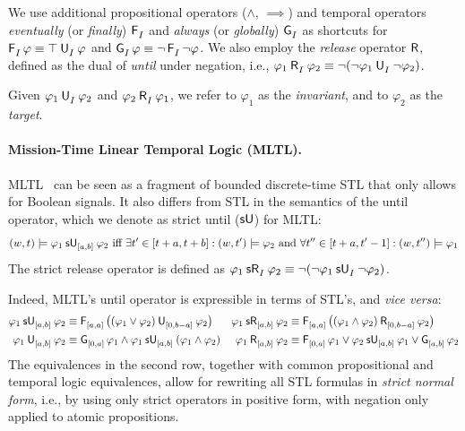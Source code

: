 \documentclass{easychair}
\begin{document}
We use additional propositional operators ($\land$, $\implies$)
and temporal operators \emph{eventually} (or \emph{finally}) $\even{I}$
and \emph{always} (or \emph{globally}) $\glob{I}$ as shortcuts for
$\even{I} \varphi \equiv \until{I}{\top}{\varphi}$
and $\glob{I} \varphi \equiv \neg \even{I} \neg \varphi$.
%
We also employ the \emph{release} operator $\releaseop$, defined as the dual of \emph{until} under negation, i.e., $\release{I}{\varphi_1}{\varphi_2} \equiv \neg (\until{I}{\neg \varphi_1}{\neg \varphi_2})$.

Given $\until{I}{\varphi_1}{\varphi_2}$ and $\release{I}{\varphi_2}{\varphi_1}$, we refer to $\varphi_1$ as the \emph{invariant}, and to $\varphi_2$ as the \emph{target}.

\paragraph{Mission-Time Linear Temporal Logic (MLTL).}
MLTL~\cite{ReinbacherRS14} can be seen as
a fragment of bounded discrete-time STL that only allows for Boolean signals.
It also differs from STL in the semantics of the until operator, which we denote as strict until ($\suntilop{}$) for MLTL:
\[
(w,t) \models \suntil{[a,b]}{\varphi_1}{\varphi_2}  \text{ iff }
    \exists t' \in [t+a, t+b] : (w, t') \models \varphi_2
    \text{ and } \forall t'' \in [t+a, t'-1] : (w,t'') \models \varphi_1
\]
The strict release operator is defined as
$\srelease{I}{\varphi_1}{\varphi_2} \equiv \neg (\suntil{I}{\neg\varphi_1}{\neg\varphi_2})$.

Indeed, MLTL's until operator is expressible in terms of STL's, and \emph{vice versa}:
\begin{align*}
    \suntil{[a,b]}{\varphi_1}{\varphi_2} &\equiv
    \even{[a,a]} \big(\until{[0, b-a]}{(\varphi_1 \lor \varphi_2)}{\varphi_2}\big) &
    \srelease{[a,b]}{\varphi_1}{\varphi_2} &\equiv
    \even{[a,a]} \big(\release{[0, b-a]}{(\varphi_1 \land \varphi_2)}{\varphi_2}\big) \\
    \until{[a,b]}{\varphi_1}{\varphi_2} &\equiv \glob{[0,a]} \varphi_1 \land \suntil{[a,b]}{\varphi_1}{(\varphi_1 \land \varphi_2)} &
    \release{[a,b]}{\varphi_1}{\varphi_2} &\equiv \even{[0,a]} \varphi_1 \lor \suntil{[a,b]}{\varphi_2}{\varphi_1} \lor \glob{[a,b]} \varphi_2
\end{align*}
The equivalences in the second row, together with common propositional and temporal logic equivalences, allow for rewriting all STL formulas in \emph{strict normal form}, i.e.,
by using only strict operators in positive form, with negation only applied to atomic propositions.
\end{document}

